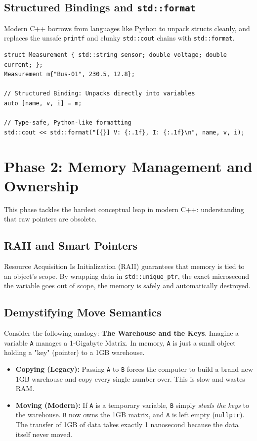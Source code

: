 \documentclass[11pt,a4paper]{article}
\begin{document}
\subsection{Structured Bindings and \texttt{std::format}}
Modern C++ borrows from languages like Python to unpack structs cleanly, and replaces the unsafe \texttt{printf} and clunky \texttt{std::cout} chains with \texttt{std::format}.

\begin{lstlisting}[caption={Phase 1: Clean Data Unpacking and Formatting}]
struct Measurement { std::string sensor; double voltage; double current; };
Measurement m{"Bus-01", 230.5, 12.8};

// Structured Binding: Unpacks directly into variables
auto [name, v, i] = m; 

// Type-safe, Python-like formatting
std::cout << std::format("[{}] V: {:.1f}, I: {:.1f}\n", name, v, i);
\end{lstlisting}

\section{Phase 2: Memory Management and Ownership}
This phase tackles the hardest conceptual leap in modern C++: understanding that raw pointers are obsolete. 

\subsection{RAII and Smart Pointers}
Resource Acquisition Is Initialization (RAII) guarantees that memory is tied to an object's scope. By wrapping data in \texttt{std::unique\_ptr}, the exact microsecond the variable goes out of scope, the memory is safely and automatically destroyed.

\subsection{Demystifying Move Semantics}
Consider the following analogy: \textbf{The Warehouse and the Keys}.
Imagine a variable \texttt{A} manages a 1-Gigabyte Matrix. In memory, \texttt{A} is just a small object holding a "key" (pointer) to a 1GB warehouse.
\begin{itemize}
    \item \textbf{Copying (Legacy):} Passing \texttt{A} to \texttt{B} forces the computer to build a brand new 1GB warehouse and copy every single number over. This is slow and wastes RAM.
    \item \textbf{Moving (Modern):} If \texttt{A} is a temporary variable, \texttt{B} simply \textit{steals the keys} to the warehouse. \texttt{B} now owns the 1GB matrix, and \texttt{A} is left empty (\texttt{nullptr}). The transfer of 1GB of data takes exactly 1 nanosecond because the data itself never moved.
\end{itemize}
\end{document}

